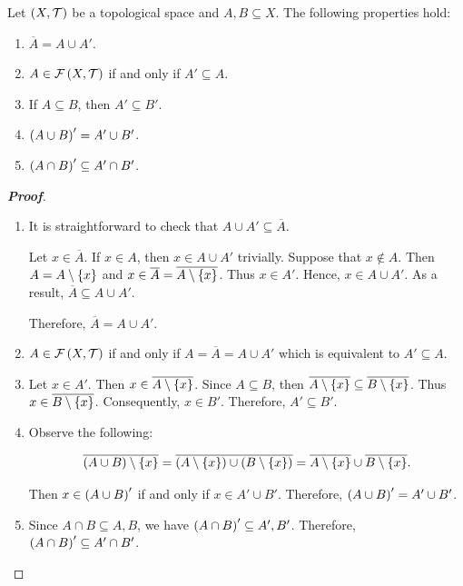 \begin{proposition}
  Let $\left(X,\mathcal{T}\right)$ be a topological space and $A,B\subseteq X$. The following properties hold:
  \begin{enumerate}
    \item $\overline{A}=A\cup A'$.
    \item $A\in\mathcal{F}\left(X,\mathcal{T}\right)$ if and only if $A'\subseteq A$.
    \item If $A\subseteq B$, then $A'\subseteq B'$.
    \item $\left(A\cup B\right)'=A'\cup B'$.
    \item $\left(A\cap B\right)'\subseteq A'\cap B'$. 
  \end{enumerate}
  \begin{proof}[\rm\textbf{Proof}]
    \hfill
    \begin{enumerate}
      \item It is straightforward to check that $A\cup A'\subseteq\overline{A}$. 
      
      Let $x\in\overline{A}$. If $x\in A$, then $x\in A\cup A'$ trivially. Suppose that $x\notin A$. Then $A=A\setminus\left\{x\right\}$ and $x\in\overline{A}=\overline{A\setminus\left\{x\right\}}$. Thus $x\in A'$. Hence, $x\in A\cup A'$. As a result, $\overline{A}\subseteq A\cup A'$. 
      
      Therefore, $\overline{A}=A\cup A'$.
      \item $A\in\mathcal{F}\left(X,\mathcal{T}\right)$ if and only if $A=\overline{A}=A\cup A'$ which is equivalent to $A'\subseteq A$.
      \item Let $x\in A'$. Then $x\in\overline{A\setminus\left\{x\right\}}$. Since $A\subseteq B$, then $\overline{A\setminus\left\{x\right\}}\subseteq\overline{B\setminus\left\{x\right\}}$. Thus $x\in\overline{B\setminus\left\{x\right\}}$. Consequently, $x\in B'$. Therefore, $A'\subseteq B'$.
      \item Observe the following:

      \begin{equation}
        \overline{\left(A\cup B\right)\setminus\left\{x\right\}}=\overline{\left(A\setminus\left\{x\right\}\right)\cup\left(B\setminus\left\{x\right\}\right)}=\overline{A\setminus\left\{x\right\}}\cup\overline{B\setminus\left\{x\right\}}.
      \end{equation}
      
      Then $x\in \left(A\cup B\right)'$ if and only if $x\in A'\cup B'$. Therefore, $\left(A\cup B\right)'=A'\cup B'$.
      \item Since $A\cap B\subseteq A,B$, we have $\left(A\cap B\right)'\subseteq A',B'$. Therefore, $\left(A\cap B\right)'\subseteq A'\cap B'$.
    \end{enumerate}
  \end{proof}
\end{proposition}

